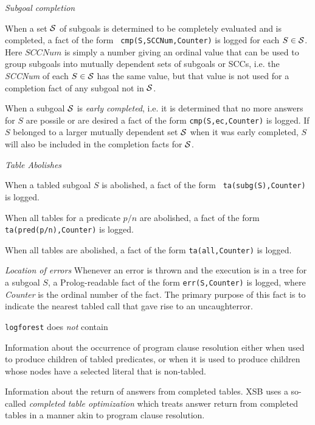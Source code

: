 \item {\em Subgoal completion}
\bi
\item When a set ${\cal S}$ of subgoals is determined to be completely
  evaluated and is completed, a fact of the form {\tt
    cmp(S,SCCNum,Counter)} is logged for each $S \in {\cal S}$.  Here
  $SCCNum$ is simply a number giving an ordinal value that can be used
  to group subgoals into mutually dependent sets of subgoals or SCCs,
  i.e. the {\em SCCNum} of each $S \in {\cal S}$ has the same value, but
  that value is not used for a completion fact of any subgoal not in
  ${\cal S}$.
%
\item When a subgoal ${\cal S}$ is {\em early completed}, i.e. it is
  determined that no more answers for $S$ are possile or are desired a
  fact of the form {\tt cmp(S,ec,Counter)} is logged.  If $S$ belonged
  to a larger mutually dependent set ${\cal S}$ when it was early
  completed, $S$ will also be included in the completion facts for
  ${\cal S}$.
\ei
\item {\em Table Abolishes}
\bi
\item When a tabled subgoal $S$ is abolished, a fact of the form {\tt
  ta(subg(S),Counter)} is logged.
\item When all tables for a predicate $p/n$ are abolished, a fact of
  the form {\tt ta(pred(p/n),Counter)} is logged.
\item When all tables are abolished, a fact of the form {\tt ta(all,Counter)} is logged.
\ei
%
\item {\em Location of errors} Whenever an error is thrown and the
  execution is in a tree for a subgoal $S$, a Prolog-readable fact of
  the form {\tt err(S,Counter)} is logged, where {\em Counter} is the
  ordinal number of the fact.  The primary purpose of this fact is to
  indicate the nearest tabled call that gave rise to an uncaughterror.  \ei

{\tt logforest} does {\em not} contain

\bi
\item Information about the occurrence of program clause resolution
  either when used to produce children of tabled predicates, or when
  it is used to produce children whose nodes have a selected literal
  that is non-tabled.

\item Information about the return of answers from completed tables.
  XSB uses a so-called {\em completed table optimization} which treats
  answer return from completed tables in a manner akin to program
  clause resolution.  
 \ei


